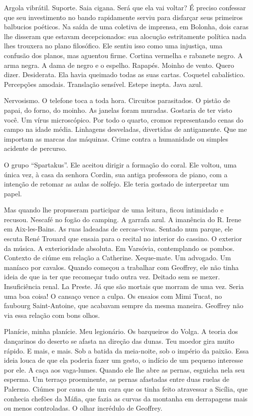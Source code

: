 Argola vibrátil. Suporte. Saia cigana. Será que ela vai voltar? É
preciso confessar que seu investimento no bando rapidamente serviu para
disfarçar seus primeiros balbucios poéticos. Na saída de uma coletiva de
imprensa, em Bolonha, dois caras lhe disseram que estavam decepcionados:
sua alocução estritamente política nada lhes trouxera no plano
filosófico. Ele sentiu isso como uma injustiça, uma confusão dos planos,
mas aguentou firme. Cortina vermelha e rabanete negro. A arma negra. A
dama de negro e o espelho. Rapapés. Moinho de vento. Quero dizer.
Desiderata. Ela havia queimado todas as suas cartas. Coquetel
cabalístico. Percepções amodais. Translação sensível. Estepe inepta.
Java azul.

Nervosismo. O telefone toca a toda hora. Circuitos parasitados. O pistão
de papai, do forno, do moinho. As janelas foram muradas. Gostaria de ter
visto você. Um vírus microscópico. Por todo o quarto, cromos
representando cenas do campo na idade média. Linhagens desveladas,
divertidas de antigamente. Que me importam as marcas das máquinas. Crime
contra a humanidade ou simples acidente de percurso.

O grupo ``Spartakus''. Ele aceitou dirigir a formação do coral. Ele
voltou, uma única vez, à casa da senhora Cordin, sua antiga professora
de piano, com a intenção de retomar as aulas de solfejo. Ele teria
gostado de interpretar um papel.

Mas quando lhe propuseram participar de uma leitura, ficou intimidado e
recusou. Nescafé no fogão do camping. A garrafa azul. A imanência do R.
Irene em Aix-les-Bains. As ruas ladeadas de cercas-vivas. Sentado num
parque, ele escuta René Trouard que ensaia para o recital no interior do
cassino. O exterior da música. A exterioridade absoluta. Em Varsóvia,
contemplando os pombos. Contexto de ciúme em relação a Catherine.
Xeque-mate. Um advogado. Um maníaco por cavalos. Quando começou a
trabalhar com Geoffrey, ele não tinha ideia de que ia ter que recomeçar
tudo outra vez. Deitado sem se mexer. Insuficiência renal. La Preste. Já
que são mortais que morram de uma vez. Seria uma boa coisa! O cansaço
vence a culpa. Os ensaios com Mimi Tucat, no faubourg Saint-Antoine, que
acabavam sempre da mesma maneira. Geoffrey não via essa relação com bons
olhos.

Planície, minha planície. Meu legionário. Os barqueiros do Volga. A
teoria dos dançarinos do deserto se afasta na direção das dunas. Teu
moedor gira muito rápido. E mais, e mais. Sob a batida da meia-noite,
sob o império da paixão. Essa ideia louca de que ela poderia fazer um
gesto, o indício de um pequeno interesse por ele. A caça aos vaga-lumes.
Quando ele lhe abre as pernas, esguicha nela seu esperma. Um terraço
proeminente, as pernas afastadas entre duas ruelas de Palermo. Ciúmes
por causa de um cara que os tinha feito atravessar a Sicília, que
conhecia chefões da Máfia, que fazia as curvas da montanha em
derrapagens mais ou menos controladas. O olhar incrédulo de Geoffrey.

